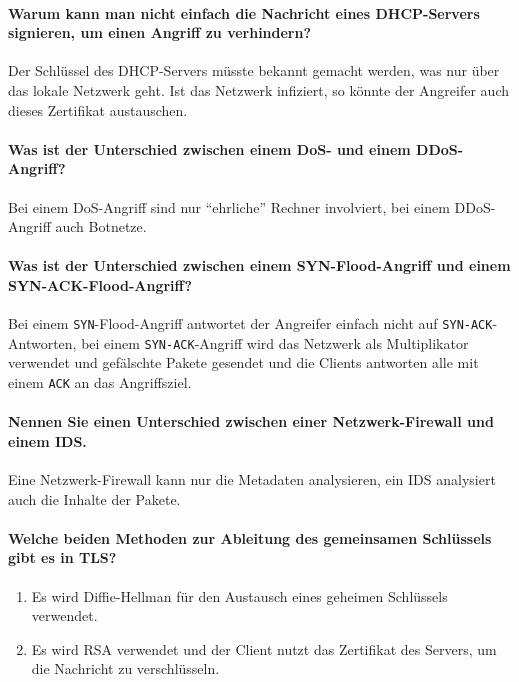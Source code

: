 		\paragraph{Warum kann man nicht einfach die Nachricht eines DHCP-Servers signieren, um einen Angriff zu verhindern?}
		Der Schlüssel des DHCP-Servers müsste bekannt gemacht werden, was nur über das lokale Netzwerk geht. Ist das Netzwerk infiziert, so könnte der Angreifer auch dieses Zertifikat austauschen.
		
		\paragraph{Was ist der Unterschied zwischen einem DoS- und einem DDoS-Angriff?}
		Bei einem DoS-Angriff sind nur \enquote{ehrliche} Rechner involviert, bei einem DDoS-Angriff auch Botnetze.
		
		\paragraph{Was ist der Unterschied zwischen einem SYN-Flood-Angriff und einem SYN-ACK-Flood-Angriff?}
		Bei einem \texttt{SYN}-Flood-Angriff antwortet der Angreifer einfach nicht auf \texttt{SYN-ACK}-Antworten, bei einem \texttt{SYN-ACK}-Angriff wird das Netzwerk als Multiplikator verwendet und gefälschte Pakete gesendet und die Clients antworten alle mit einem \texttt{ACK} an das Angriffsziel.
		
		\paragraph{Nennen Sie einen Unterschied zwischen einer Netzwerk-Firewall und einem IDS.}
		Eine Netzwerk-Firewall kann nur die Metadaten analysieren, ein IDS analysiert auch die Inhalte der Pakete.
		
		\paragraph{Welche beiden Methoden zur Ableitung des gemeinsamen Schlüssels gibt es in TLS?}
		\begin{enumerate}
			\item Es wird Diffie-Hellman für den Austausch eines geheimen Schlüssels verwendet.
			\item Es wird RSA verwendet und der Client nutzt das Zertifikat des Servers, um die Nachricht zu verschlüsseln.
		\end{enumerate}
		
